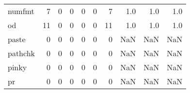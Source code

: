 \begin{tabular}{lrrrrrrrrr}
numfmt    &                                       7 &                                                  0 &                                                  0 &                                                  0 &                                                  0 &                                                  7 &                                                1.0 &                                    1.0 &                                  1.0 \\
od        &                                      11 &                                                  0 &                                                  0 &                                                  0 &                                                  0 &                                                 11 &                                                1.0 &                                    1.0 &                                  1.0 \\
paste     &                                       0 &                                                  0 &                                                  0 &                                                  0 &                                                  0 &                                                  0 &                                                NaN &                                    NaN &                                  NaN \\
pathchk   &                                       0 &                                                  0 &                                                  0 &                                                  0 &                                                  0 &                                                  0 &                                                NaN &                                    NaN &                                  NaN \\
pinky     &                                       0 &                                                  0 &                                                  0 &                                                  0 &                                                  0 &                                                  0 &                                                NaN &                                    NaN &                                  NaN \\
pr        &                                       0 &                                                  0 &                                                  0 &                                                  0 &                                                  0 &                                                  0 &                                                NaN &                                    NaN &                                  NaN \\

\end{tabular}
